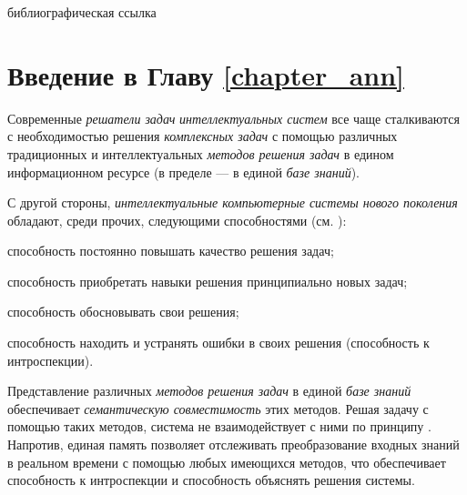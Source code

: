\begin{SCn}
	\bigskip

	\begin{scnrelfromlist}{библиографическая ссылка}
	\end{scnrelfromlist}

\end{SCn}

\section*{Введение в Главу \ref{chapter_ann}}

Современные \textit{решатели задач} \textit{интеллектуальных систем} все чаще сталкиваются с необходимостью решения \textit{комплексных задач} с помощью различных традиционных и интеллектуальных \textit{методов решения задач} в едином информационном ресурсе (в пределе --- в единой \textit{базе знаний}).

С другой стороны, \textit{интеллектуальные компьютерные системы нового поколения} обладают, среди прочих, следующими способностями (см. ):
\begin{textitemize}
	\item способность постоянно повышать качество решения задач;
	\item способность приобретать навыки решения принципиально новых задач;
	\item способность обосновывать свои решения;
	\item способность находить и устранять ошибки в своих решения (способность к интроспекции).
\end{textitemize}

Представление различных \textit{методов решения задач} в единой \textit{базе знаний} обеспечивает \textit{семантическую совместимость} этих методов. Решая задачу с помощью таких методов, система не взаимодействует с ними по принципу . Напротив, единая память позволяет отслеживать преобразование входных знаний в реальном времени с помощью любых имеющихся методов, что обеспечивает способность к интроспекции и способность объяснять решения системы.

